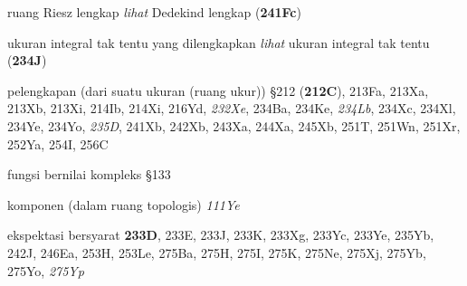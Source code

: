 ruang Riesz lengkap {\it lihat} Dedekind lengkap ({\bf 241Fc})










 ukuran integral tak tentu yang dilengkapkan {\it lihat} ukuran integral tak tentu ({\bf 234J})
























{pelengkapan } (dari suatu ukuran (ruang ukur)) \S212 ({\bf 212C}), 213Fa, 213Xa, 213Xb, 213Xi, 214Ib, 214Xi, 216Yd, {\it 232Xe}, 234Ba, 234Ke, {\it 234Lb}, 234Xc, 234Xl, 234Ye, 234Yo, {\it 235D}, 241Xb, 242Xb, 243Xa, 244Xa, 245Xb, 251T, 251Wn, 251Xr, 252Ya, 254I, 256C






















 fungsi bernilai kompleks \S133

 komponen (dalam ruang topologis) {\it 111Ye}





























ekspektasi bersyarat {\bf 233D}, 233E, 233J, 233K, 233Xg, 233Yc, 233Ye, 235Yb, 242J, 246Ea, 253H, 253Le, 275Ba, 275H, 275I, 275K, 275Ne, 275Xj, 275Yb, 275Yo, {\it 275Yp}



